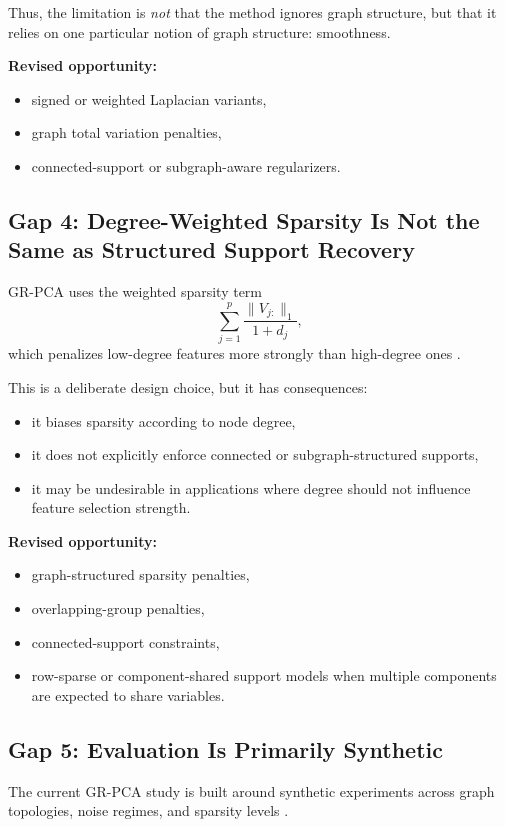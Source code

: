 \documentclass[11pt]{article}
\begin{document}
Thus, the limitation is \emph{not} that the method ignores graph structure, but that it relies on one particular notion of graph structure: smoothness.

\textbf{Revised opportunity:}
\begin{itemize}
    \item signed or weighted Laplacian variants,
    \item graph total variation penalties,
    \item connected-support or subgraph-aware regularizers.
\end{itemize}

\subsection{Gap 4: Degree-Weighted Sparsity Is Not the Same as Structured Support Recovery}

GR-PCA uses the weighted sparsity term
\[
\sum_{j=1}^p \frac{\|V_{j:}\|_1}{1+d_j},
\]
which penalizes low-degree features more strongly than high-degree ones \cite{briola2026grpca}.

This is a deliberate design choice, but it has consequences:
\begin{itemize}
    \item it biases sparsity according to node degree,
    \item it does not explicitly enforce connected or subgraph-structured supports,
    \item it may be undesirable in applications where degree should not influence feature selection strength.
\end{itemize}

\textbf{Revised opportunity:}
\begin{itemize}
    \item graph-structured sparsity penalties,
    \item overlapping-group penalties,
    \item connected-support constraints,
    \item row-sparse or component-shared support models when multiple components are expected to share variables.
\end{itemize}

\subsection{Gap 5: Evaluation Is Primarily Synthetic}

The current GR-PCA study is built around synthetic experiments across graph topologies, noise regimes, and sparsity levels \cite{briola2026grpca}.
\end{document}
